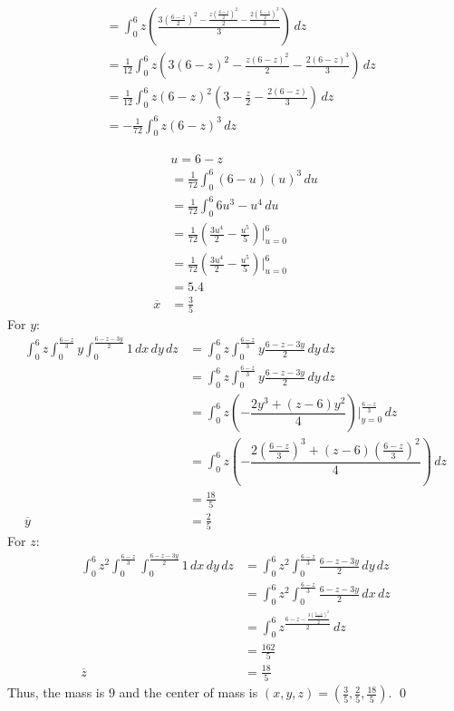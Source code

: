 \documentclass[12pt]{exam}
\begin{document}
\begin{questions}
\begin{solution}
\begin{align*}
            &= \int_{0}^{6}z \left(\frac{3\left(\frac{6 - z}{2}\right)^2 - \frac{z\left(\frac{6 - z}{2}\right)^2}{2} - \frac{2\left(\frac{6 - z}{2}\right)^3}{3}}{3}\right)\, dz \\
            &= \frac{1}{12}\int_{0}^{6}z \left(3\left(6 - z\right)^2 - \frac{z\left(6 - z\right)^2}{2} - \frac{2\left(6 - z\right)^3}{3}\right)\, dz \\
            &= \frac{1}{12}\int_{0}^{6}z (6-z)^2\left(3 - \frac{z}{2} - \frac{2\left(6 - z\right)}{3}\right)\, dz \\
            &= -\frac{1}{72}\int_{0}^{6}z (6-z)^3\, dz
        \end{align*}
    \end{solution}
    
    \begin{align*}
        &u = 6 - z \\
        &= \frac{1}{72}\int_{0}^{6}(6-u)(u)^3 \, du \\
        &= \frac{1}{72}\int_{0}^{6}6u^3-u^4 \, du \\
        &= \frac{1}{72}\left( \frac{3u^4}{2}-\frac{u^5}{5} \right)|_{u=0}^{6} \\
        &= \frac{1}{72}\left( \frac{3u^4}{2}-\frac{u^5}{5} \right)|_{u=0}^{6} \\
         &= 5.4 \\
         \overline{x} &= \frac{3}{5}
    \end{align*}
    For $y$:
    \begin{align*}
        \int_{0}^{6}z\int_{0}^{\frac{6 - z}{3}} y \int_{0}^{\frac{6 - z - 3y}{2}}  1 \, dx\, dy\, dz &= \int_{0}^{6}z\int_{0}^{\frac{6 - z}{3}} y \frac{6 - z - 3y}{2} \, dy\, dz \\
        &= \int_{0}^{6}z\int_{0}^{\frac{6 - z}{3}} y \frac{6 - z - 3y}{2} \, dy\, dz \\
        &= \int_{0}^{6}z \left( -\dfrac{2y^3+\left(z-6\right)y^2}{4} \right)|_{y = 0}^{\frac{6 - z}{3}} \, dz \\
        &= \int_{0}^{6}z \left( -\dfrac{2\left(\frac{6 - z}{3}\right)^3+\left(z-6\right)\left(\frac{6 - z}{3}\right)^2}{4} \right) \, dz \\
        &= \frac{18}{5} \\
        \overline{y} &= \frac{2}{5}
    \end{align*}
    For $z$: 
    \begin{align*}
        \int_{0}^{6} z^2 \int_{0}^{\frac{6 - z}{3}} \int_{0}^{\frac{6 - z - 3y}{2}} 1 \, dx\, dy\, dz &= \int_{0}^{6} z^2 \int_{0}^{\frac{6 - z}{3}} \frac{6 - z - 3y}{2} \, dy\, dz \\
        &= \int_{0}^{6}z^2 \int_{0}^{\frac{6 - z}{3}} \frac{6 - z - 3y}{2} \, dx\, dz \\
        &= \int_{0}^{6} z^ \frac{6 - z - \frac{3\left(\frac{6 - z}{3}\right)^2}{2}}{2} \, dz \\
        &= \frac{162}{5} \\
        \overline{z} &= \frac{18}{5}
    \end{align*}
    Thus, the mass is $\boxed{9}$ and the center of mass is $(x, y, z) = \boxed{\left(\frac{3}{5}, \frac{2}{5}, \frac{18}{5} \right)}$. \qed


\end{questions}
\end{document}
